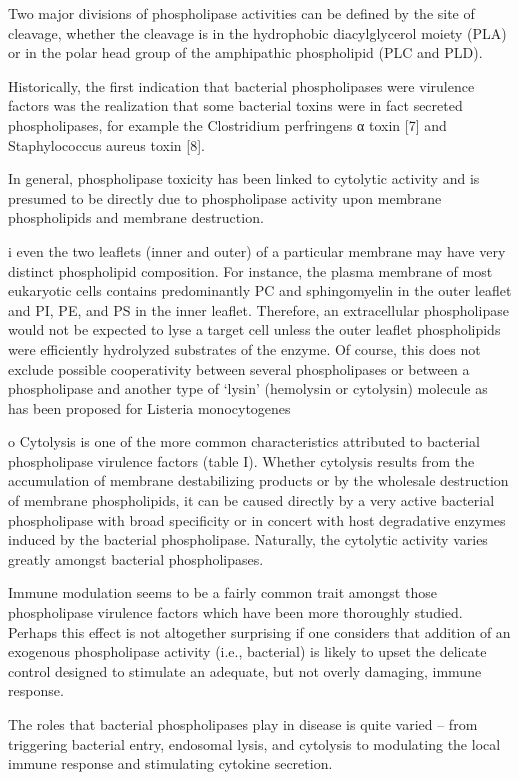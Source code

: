 Two major divisions of phospholipase activities can be deﬁned by the site of cleavage, whether the cleavage is in the hydrophobic diacylglycerol moiety (PLA) or in the polar head group of the amphipathic phospholipid (PLC and PLD).


Historically, the ﬁrst indication that bacterial phospholipases were virulence factors was the realization that some bacterial toxins were in fact secreted phospholipases, for example the Clostridium perfringens α toxin [7] and Staphylococcus aureus toxin [8].


In general, phospholipase toxicity has been linked to cytolytic activity and is presumed to be directly due to phospholipase activity upon membrane phospholipids and membrane destruction.

i even the two leaﬂets (inner and outer) of a particular membrane may have very distinct phospholipid composition. For instance, the plasma membrane of most eukaryotic cells contains predominantly PC and sphingomyelin in the outer leaﬂet and PI, PE, and PS in the inner leaﬂet. Therefore, an extracellular phospholipase would not be expected to lyse a target cell unless the outer leaﬂet phospholipids were efficiently hydrolyzed substrates of the enzyme. Of course, this does not exclude possible cooperativity between several phospholipases or between a phospholipase and another type of ‘lysin’ (hemolysin or cytolysin) molecule as has been proposed for Listeria monocytogenes 

o Cytolysis is one of the more common characteristics attributed to bacterial phospholipase virulence factors (table I). Whether cytolysis results from the accumulation of membrane destabilizing products or by the wholesale destruction of membrane phospholipids, it can be caused directly by a very active bacterial phospholipase with broad speciﬁcity or in concert with host degradative enzymes induced by the bacterial phospholipase. Naturally, the cytolytic activity varies greatly amongst bacterial phospholipases.

Immune modulation seems to be a fairly common trait amongst those phospholipase virulence factors which have been more thoroughly studied. Perhaps this effect is not altogether surprising if one considers that addition of an exogenous phospholipase activity (i.e., bacterial) is likely to upset the delicate control designed to stimulate an adequate, but not overly damaging, immune response. 



The roles that bacterial phospholipases play in disease is quite varied – from triggering bacterial entry, endosomal lysis, and cytolysis to modulating the local immune response and stimulating cytokine secretion.



